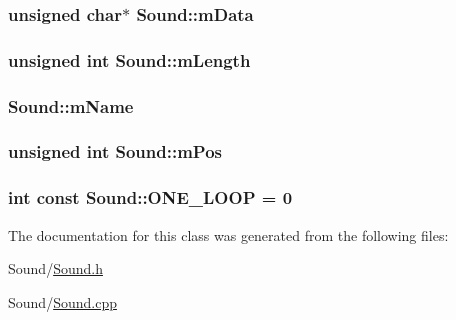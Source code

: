 \subsubsection[{\texorpdfstring{m\+Data}{mData}}]{\setlength{\rightskip}{0pt plus 5cm}unsigned char$\ast$ Sound\+::m\+Data\hspace{0.3cm}{\ttfamily [private]}}\hypertarget{classSound_a14bb7e5b58b94200f127ba3d36177faa}{}\label{classSound_a14bb7e5b58b94200f127ba3d36177faa}
\subsubsection[{\texorpdfstring{m\+Length}{mLength}}]{\setlength{\rightskip}{0pt plus 5cm}unsigned int Sound\+::m\+Length\hspace{0.3cm}{\ttfamily [private]}}\hypertarget{classSound_a9fd54151c48085f675c399f60c58b88c}{}\label{classSound_a9fd54151c48085f675c399f60c58b88c}
\subsubsection[{\texorpdfstring{m\+Name}{mName}}]{ Sound\+::m\+Name\hspace{0.3cm}{\ttfamily [private]}}\hypertarget{classSound_a8da7970829ae8e108dfb0e730e71a0ab}{}\label{classSound_a8da7970829ae8e108dfb0e730e71a0ab}
\subsubsection[{\texorpdfstring{m\+Pos}{mPos}}]{\setlength{\rightskip}{0pt plus 5cm}unsigned int Sound\+::m\+Pos\hspace{0.3cm}{\ttfamily [private]}}\hypertarget{classSound_ae82c1f3012ef1ea0cdbb95b2a1c315c8}{}\label{classSound_ae82c1f3012ef1ea0cdbb95b2a1c315c8}
\subsubsection[{\texorpdfstring{O\+N\+E\+\_\+\+L\+O\+OP}{ONE_LOOP}}]{\setlength{\rightskip}{0pt plus 5cm}int const Sound\+::\+O\+N\+E\+\_\+\+L\+O\+OP = 0\hspace{0.3cm}{\ttfamily [static]}}\hypertarget{classSound_a60e713429c43fbaeb5cef8953ca2ee69}{}\label{classSound_a60e713429c43fbaeb5cef8953ca2ee69}


The documentation for this class was generated from the following files\+:\begin{DoxyCompactItemize}
\item 
Sound/\hyperlink{Sound_8h}{Sound.\+h}\item 
Sound/\hyperlink{Sound_8cpp}{Sound.\+cpp}\end{DoxyCompactItemize}
